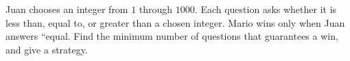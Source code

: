 Juan chooses an integer from $1$ through $1000$. Each question asks whether it is less than, equal to, or greater than a chosen integer. Mario wins only when Juan answers ``equal. Find the minimum number of questions that guarantees a win, and give a strategy.
